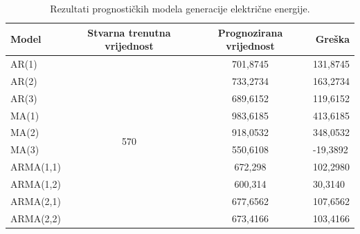 \documentclass[a4paper,12pt,oneside]{memoir}
\begin{document}
        \begin{table}[H]
            \caption{Rezultati prognostičkih modela generacije električne energije.}
            \renewcommand{\arraystretch}{2}
            \begin{tabular}{|l|c|c|l|}
                \hline
                \textbf{Model} & \textbf{Stvarna trenutna vrijednost} & \textbf{Prognozirana vrijednost} & \multicolumn{1}{r|}{\textbf{Greška}} \\ \hline
                AR(1)          & \multirow{10}{*}{570}                & 701,8745                         & 131,8745                             \\ \cline{1-1} \cline{3-4} 
                AR(2)          &                                      & 733,2734                         & 163,2734                             \\ \cline{1-1} \cline{3-4} 
                AR(3)          &                                      & 689,6152                         & 119,6152                             \\ \cline{1-1} \cline{3-4} 
                MA(1)          &                                      & 983,6185                         & 413,6185                             \\ \cline{1-1} \cline{3-4} 
                MA(2)          &                                      & 918,0532                         & 348,0532                             \\ \cline{1-1} \cline{3-4} 
                MA(3)          &                                      & 550,6108                         & -19,3892                             \\ \cline{1-1} \cline{3-4} 
                ARMA(1,1)      &                                      & 672,298                          & 102,2980                             \\ \cline{1-1} \cline{3-4} 
                ARMA(1,2)      &                                      & 600,314                          & 30,3140                              \\ \cline{1-1} \cline{3-4} 
                ARMA(2,1)      &                                      & 677,6562                         & 107,6562                             \\ \cline{1-1} \cline{3-4} 
                ARMA(2,2)      &                                      & 673,4166                         & 103,4166                             \\ \hline
            \end{tabular}
            \renewcommand{\arraystretch}{1}
            \label{tab:solar}
        \end{table}
\end{document}
